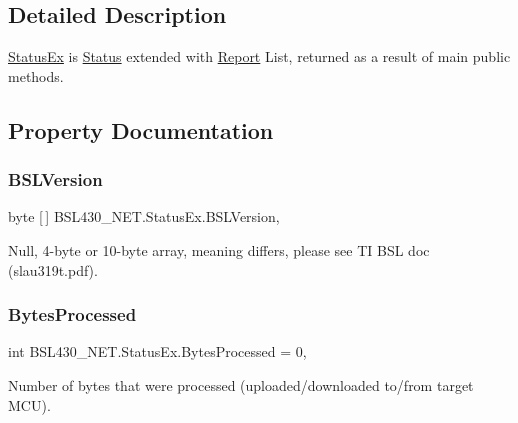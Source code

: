 \subsection{Detailed Description}
\mbox{\hyperlink{class_b_s_l430___n_e_t_1_1_status_ex}{Status\+Ex}} is \mbox{\hyperlink{class_b_s_l430___n_e_t_1_1_status}{Status}} extended with \mbox{\hyperlink{class_b_s_l430___n_e_t_1_1_report}{Report}} List, returned as a result of main public methods. 



\subsection{Property Documentation}
\mbox{\label{class_b_s_l430___n_e_t_1_1_status_ex_a1373af4a2572ec35a83b9d34f16308a6}} 
\subsubsection{\texorpdfstring{BSLVersion}{BSLVersion}}
{\footnotesize\ttfamily byte \mbox{[}$\,$\mbox{]} B\+S\+L430\+\_\+\+N\+E\+T.\+Status\+Ex.\+B\+S\+L\+Version\hspace{0.3cm}{\ttfamily [get]}, {\ttfamily [set]}}



Null, 4-\/byte or 10-\/byte array, meaning differs, please see TI B\+SL doc (slau319t.\+pdf). 

\mbox{\label{class_b_s_l430___n_e_t_1_1_status_ex_ae5f74b0e3a46400e9b6b59f70ca43d21}} 
\subsubsection{\texorpdfstring{BytesProcessed}{BytesProcessed}}
{\footnotesize\ttfamily int B\+S\+L430\+\_\+\+N\+E\+T.\+Status\+Ex.\+Bytes\+Processed = 0\hspace{0.3cm}{\ttfamily [get]}, {\ttfamily [set]}}



Number of bytes that were processed (uploaded/downloaded to/from target M\+CU). 


